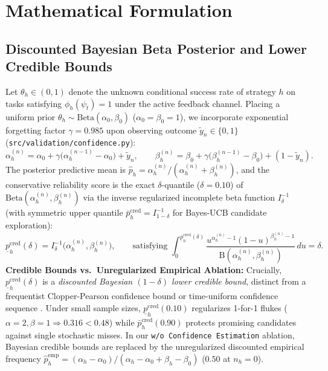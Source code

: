 \documentclass[10pt,letterpaper]{article}
\begin{document}
\section{Mathematical Formulation}
\label{sec:math}

\subsection{Discounted Bayesian Beta Posterior and Lower Credible Bounds}
Let $\theta_h \in (0,1)$ denote the unknown conditional success rate of strategy $h$ on tasks satisfying $\phi_h(\psi_t) = 1$ under the active feedback channel. Placing a uniform prior $\theta_h \sim \mathrm{Beta}(\alpha_0, \beta_0)$ ($\alpha_0 = \beta_0 = 1$), we incorporate exponential forgetting factor $\gamma = 0.985$ upon observing outcome $\tilde{y}_n \in \{0,1\}$ (\texttt{src/validation/confidence.py}):
\begin{equation}
  \alpha_h^{(n)} = \alpha_0 + \gamma \bigl(\alpha_h^{(n-1)} - \alpha_0\bigr) + \tilde{y}_n, \qquad
  \beta_h^{(n)}  = \beta_0  + \gamma \bigl(\beta_h^{(n-1)}  - \beta_0\bigr)  + (1 - \tilde{y}_n).
  \label{eq:beta_update}
\end{equation}
The posterior predictive mean is $\hat{p}_h = \alpha_h^{(n)} / (\alpha_h^{(n)} + \beta_h^{(n)})$, and the conservative reliability score is the exact $\delta$-quantile ($\delta = 0.10$) of $\mathrm{Beta}(\alpha_h^{(n)}, \beta_h^{(n)})$ via the inverse regularized incomplete beta function $I_\delta^{-1}$ (with symmetric upper quantile $\bar{p}_h^{\mathrm{cred}} = I_{1-\delta}^{-1}$ for Bayes-UCB candidate exploration):
\begin{equation}
  \underline{p}_h^{\mathrm{cred}}(\delta) = I_{\delta}^{-1}\!\bigl(\alpha_h^{(n)}, \beta_h^{(n)}\bigr), \qquad \text{satisfying } \int_0^{\underline{p}_h^{\mathrm{cred}}(\delta)} \frac{u^{\alpha_h^{(n)}-1}(1-u)^{\beta_h^{(n)}-1}}{\mathrm{B}(\alpha_h^{(n)}, \beta_h^{(n)})}\,du = \delta.
  \label{eq:credible_bound}
\end{equation}
\textbf{Credible Bounds vs.\ Unregularized Empirical Ablation:} Crucially, $\underline{p}_h^{\mathrm{cred}}(\delta)$ is a \emph{discounted Bayesian $(1-\delta)$ lower credible bound}, distinct from a frequentist Clopper-Pearson confidence bound or time-uniform confidence sequence \cite{howard2021time}. Under small sample sizes, $\underline{p}_h^{\mathrm{cred}}(0.10)$ regularizes 1-for-1 flukes ($\alpha=2,\beta=1 \Rightarrow 0.316 < 0.48$) while $\bar{p}_h^{\mathrm{cred}}(0.90)$ protects promising candidates against single stochastic misses. In our \texttt{w/o Confidence Estimation} ablation, Bayesian credible bounds are replaced by the unregularized discounted empirical frequency $\hat{p}_h^{\mathrm{emp}} = (\alpha_h - \alpha_0)/(\alpha_h - \alpha_0 + \beta_h - \beta_0)$ ($0.50$ at $n_h=0$).
\end{document}
